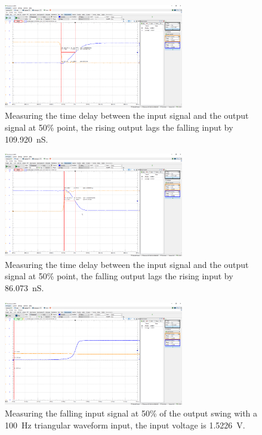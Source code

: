 \documentclass{article}
\begin{document}
	
	\begin{figure}[H]
	    \centering
	    \includegraphics[width=0.7\textwidth]{2b-3-rising-delay-lab}
	    \caption[Measuring the rising output time delay]{Measuring the time delay between the input signal and the output signal at 50\% point, the rising output lags the falling input by \SI{109.920}{nS}.}
	\end{figure}
	
	\begin{figure}[H]
	    \centering
	    \includegraphics[width=0.7\textwidth]{2b-3-falling-delay-lab}
	    \caption[Measuring the falling output time delay]{Measuring the time delay between the input signal and the output signal at 50\% point, the falling output lags the rising input by \SI{86.073}{nS}.}
	\end{figure}
	
	\begin{figure}[H]
	    \centering
	    \includegraphics[width=0.7\textwidth]{2b-2-rising-thresh-lab}
	    \caption[Measuring the falling input signal]{Measuring the falling input signal at 50\% of the output swing with a \SI{100}{Hz} triangular waveform input, the input voltage is \SI{1.5226}{V}.}
	\end{figure}
	
\end{document}
